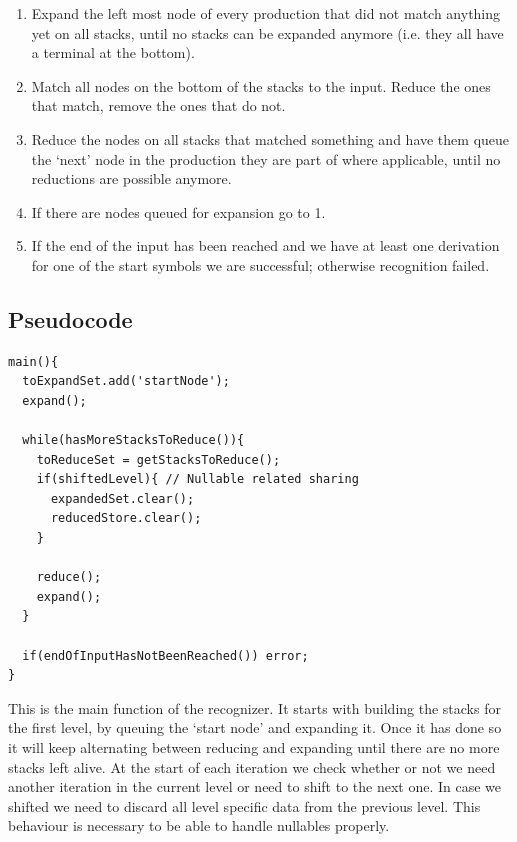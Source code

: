 \documentclass[a4paper,10pt]{article}
\begin{document}
\begin{enumerate}
 \setlength{\itemsep}{0pt}
 \setlength{\parskip}{0pt}
 \setlength{\parsep}{0pt}

 \item Expand the left most node of every production that did not match anything yet on all stacks, until no stacks can be expanded anymore (i.e. they all have a terminal at the bottom).
 \item Match all nodes on the bottom of the stacks to the input. Reduce the ones that match, remove the ones that do not.
 \item Reduce the nodes on all stacks that matched something and have them queue the `next' node in the production they are part of where applicable, until no reductions are possible anymore.
 \item If there are nodes queued for expansion go to 1.
 \item If the end of the input has been reached and we have at least one derivation for one of the start symbols we are successful; otherwise recognition failed.
\end{enumerate}

\pagebreak
\subsection{Pseudocode}

{\small
\begin{verbatim}
main(){
  toExpandSet.add('startNode');
  expand();
  
  while(hasMoreStacksToReduce()){
    toReduceSet = getStacksToReduce();
    if(shiftedLevel){ // Nullable related sharing
      expandedSet.clear();
      reducedStore.clear();
    }
    
    reduce();
    expand();
  }
  
  if(endOfInputHasNotBeenReached()) error;
}
\end{verbatim}
}

This is the main function of the recognizer. It starts with building the stacks for the first level, by queuing the `start node' and expanding it. Once it has done so it will keep alternating between reducing and expanding until there are no more stacks left alive. At the start of each iteration we check whether or not we need another iteration in the current level or need to shift to the next one. In case we shifted we need to discard all level specific data from the previous level. This behaviour is necessary to be able to handle nullables properly.
\end{document}
